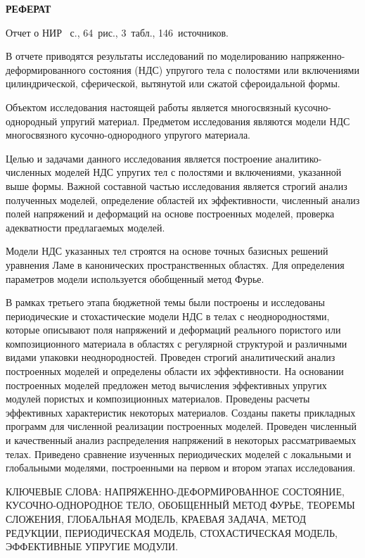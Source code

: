 
\begin{center}
{\normalsize\textbf{\centering РЕФЕРАТ}}\vspace{14pt} 
\end{center}


Отчет о НИР \pageref{LastPage}~с., 64~рис., 3~табл., 146~источников.

В отчете приводятся результаты исследований по моделированию на\-пря\-же\-н\-но-де\-фор\-ми\-ро\-ва\-н\-но\-го состояния (НДС) упругого тела с полостями или включениями цилиндрической, сферической, вытянутой или сжатой сфероидальной формы.

Объектом исследования настоящей работы является многосвязный кусочно-однородный упругий материал. Предметом исследования являются модели НДС многосвязного ку\-соч\-но-од\-но\-род\-но\-го упругого материала.

Целью и задачами данного исследования является построение ана\-ли\-ти\-ко-чис\-ле\-н\-ных моделей НДС упругих тел с полостями и включениями, указанной выше формы. Важной составной частью исследования является строгий анализ полученных моделей, определение областей их эффективности, численный анализ полей напряжений и деформаций на основе построенных моделей, проверка адекватности предлагаемых моделей.

Модели НДС указанных тел строятся на основе точных базисных решений уравнения Ламе в канонических пространственных областях. Для определения параметров модели используется обобщенный метод Фурье.

В рамках третьего этапа бюджетной темы были построены и исследованы периодические и стохастические модели НДС в телах с неоднородностями, которые описывают поля напряжений и деформаций реального пористого или композиционного материала в областях с регулярной структурой и различными видами упаковки неоднородностей. Проведен строгий аналитический анализ построенных моделей и определены области их эффективности. На основании построенных моделей предложен метод вычисления эффективных упругих модулей пористых и композиционных материалов. Проведены расчеты эффективных характеристик некоторых материалов.
Созданы пакеты прикладных программ для численной реализации построенных моделей. Проведен численный и качественный анализ распределения напряжений в некоторых рассматриваемых телах. Приведено сравнение изученных периодических моделей с локальными и глобальными моделями, построенными на первом и втором этапах исследования.

КЛЮЧЕВЫЕ СЛОВА: НАПРЯЖЕННО-ДЕФОРМИРОВАННОЕ СОСТОЯНИЕ, КУСОЧНО-ОДНОРОДНОЕ ТЕЛО, ОБОБЩЕННЫЙ МЕТОД ФУРЬЕ, ТЕОРЕМЫ СЛОЖЕНИЯ, ГЛОБАЛЬНАЯ МОДЕЛЬ, КРАЕВАЯ ЗАДАЧА, МЕТОД РЕДУКЦИИ, ПЕРИОДИЧЕСКАЯ МОДЕЛЬ, СТОХАСТИЧЕСКАЯ МОДЕЛЬ, ЭФФЕКТИВНЫЕ УПРУГИЕ МОДУЛИ.

